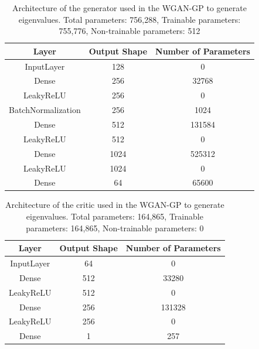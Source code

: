 \documentclass[11pt,a4paper,twoside]{report}
\begin{document}
\begin{table}[]
  \centering
  \begin{tabular}{c c c}
      \hline
      \textbf{Layer} & \textbf{Output Shape} & \textbf{Number of Parameters} \\ \hline
      InputLayer            & 128           & 0                 \\ 
      Dense                 & 256           & 32768             \\ 
      LeakyReLU             & 256           & 0                 \\ 
      BatchNormalization    & 256           & 1024              \\ 
      Dense                 & 512           & 131584            \\ 
      LeakyReLU             & 512           & 0                 \\ 
      Dense                 & 1024          & 525312            \\ 
      LeakyReLU             & 1024          & 0                 \\ 
      Dense                 & 64            & 65600             \\ 
      \end{tabular}
  \caption{Architecture of the generator used in the WGAN-GP to generate eigenvalues. Total parameters: 756,288, Trainable parameters: 755,776, Non-trainable parameters: 512}
  \label{tab:evals_generator_WGANGP_architecture}
\end{table}

\begin{table}[]
  \centering
  \begin{tabular}{c c c}
      \hline
      \textbf{Layer} & \textbf{Output Shape} & \textbf{Number of Parameters} \\ \hline
      InputLayer            & 64            & 0                 \\
      Dense                 & 512           & 33280             \\
      LeakyReLU             & 512           & 0                 \\
      Dense                 & 256           & 131328            \\
      LeakyReLU             & 256           & 0                 \\
      Dense                 & 1             & 257               \\
  \end{tabular}
  \caption{Architecture of the critic used in the WGAN-GP to generate eigenvalues. Total parameters: 164,865, Trainable parameters: 164,865, Non-trainable parameters: 0}
  \label{tab:evals_critic_WGANGP_architecture}
\end{table}
\end{document}
